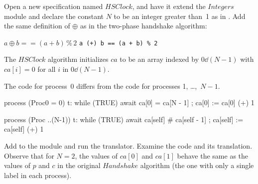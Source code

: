 \documentclass[fleqn,leqno]{article}
\begin{document}
Open a new specification named $HSClock$, and have it extend the $Integers$
module and declare the constant $N$ to be an integer greater than~1
as in .  Add the same definition
of $\oplus$ as in the two-phase handshake algorithm:
\begin{display}
\begin{twocols}[.4]
$a \oplus b == (a + b) \,\%\, 2$
\midcol
\verb|a (+) b == (a + b) % 2|
\end{twocols}
\end{display}
The $HSClock$ algorithm initializes $ca$ to be an array indexed by
$0\dd(N-1)$ with $ca[i]=0$ for all $i$ in $0\dd(N-1)$.
\begin{display}
\begin{tlatex}
\end{tlatex}
\end{display}
The code for process~0 differs from the code for processes 1, \ldots,~$N-1$.
\begin{display}
\begin{nopcal}
process (Proc0 = 0) 
  { t: while (TRUE) 
        { await ca[0]  =  ca[N - 1] ;
          ca[0]  :=  ca[0] (+) 1
        }
  }
   
process (Proc ..(N-1)) 
  { t: while (TRUE) 
        { await ca[self]  #  ca[self - 1] ;
          ca[self]  :=  ca[self] (+) 1 
        }
  }
\end{nopcal}
\begin{tlatex}
%
%
%
%
\@pvspace{8.0pt}%
%
%
%
\end{tlatex}
\end{display}
Add 
to the module and run the translator.  Examine the code and its
translation.  Observe that for $N=2$, the values of $ca[0]$ and
$ca[1]$ behave the same as the values of $p$ and $c$ in the original
$Handshake$ algorithm (the one with only a single label in each
process).
\end{document}
